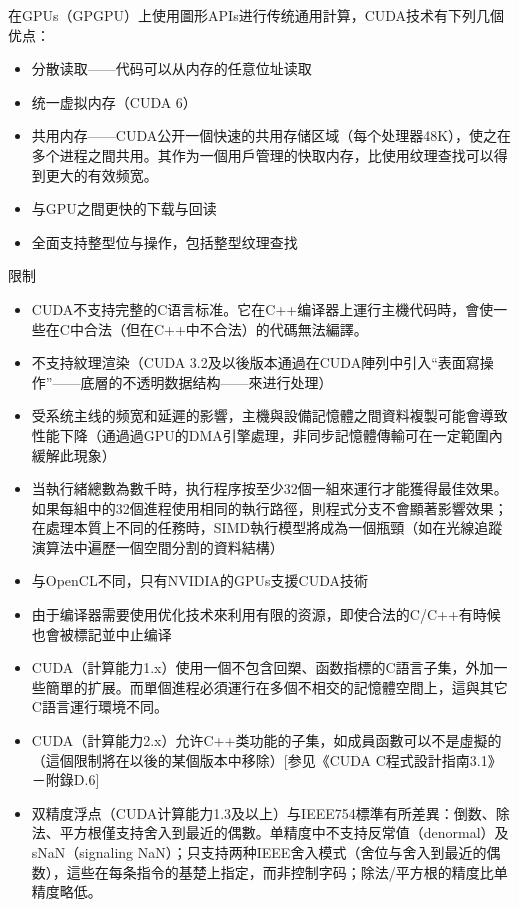 \documentclass[12pt,a4paper]{article}
\begin{document}
在GPUs（GPGPU）上使用圖形APIs进行传统通用計算，CUDA技术有下列几個优点：
\begin{itemize}
  \item 分散读取——代码可以从内存的任意位址读取
  \item 统一虚拟内存（CUDA 6）
  \item 共用内存——CUDA公开一個快速的共用存储区域（每个处理器48K），使之在多个进程之間共用。其作为一個用戶管理的快取内存，比使用纹理查找可以得到更大的有效频宽。
  \item 与GPU之間更快的下载与回读
  \item 全面支持整型位与操作，包括整型纹理查找
\end{itemize}



限制
\begin{itemize}
  \item CUDA不支持完整的C语言标准。它在C++编译器上運行主機代码時，會使一些在C中合法（但在C++中不合法）的代碼無法編譯。
  \item 不支持紋理渲染（CUDA 3.2及以後版本通過在CUDA陣列中引入“表面寫操作”——底層的不透明数据结构——來进行处理）
  \item 受系统主线的频宽和延遲的影響，主機與設備記憶體之間資料複製可能會導致性能下降（通過過GPU的DMA引擎處理，非同步記憶體傳輸可在一定範圍內緩解此現象）
  \item 当執行緒總數為數千時，执行程序按至少32個一組來運行才能獲得最佳效果。如果每組中的32個進程使用相同的執行路徑，則程式分支不會顯著影響效果；在處理本質上不同的任務時，SIMD執行模型將成為一個瓶頸（如在光線追蹤演算法中遍歷一個空間分割的資料結構）
  \item 与OpenCL不同，只有NVIDIA的GPUs支援CUDA技術
  \item 由于编译器需要使用优化技术來利用有限的资源，即使合法的C/C++有時候也會被標記並中止编译
  \item CUDA（計算能力1.x）使用一個不包含回槊、函数指標的C語言子集，外加一些簡單的扩展。而單個進程必須運行在多個不相交的記憶體空間上，這與其它C語言運行環境不同。
  \item CUDA（計算能力2.x）允许C++类功能的子集，如成員函數可以不是虛擬的（這個限制將在以後的某個版本中移除）[参见《CUDA C程式設計指南3.1》－附錄D.6]
  \item 双精度浮点（CUDA计算能力1.3及以上）与IEEE754標準有所差異：倒数、除法、平方根僅支持舍入到最近的偶數。单精度中不支持反常值（denormal）及sNaN（signaling NaN）；只支持两种IEEE舍入模式（舍位与舍入到最近的偶数），這些在每条指令的基楚上指定，而非控制字码；除法/平方根的精度比单精度略低。
\end{itemize}

\newpage
{}

\end{document}
